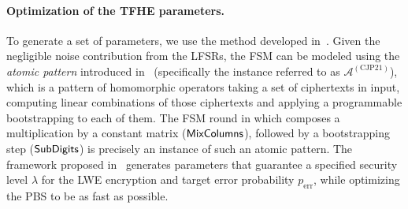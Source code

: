 \fi

\paragraph{Optimization of the TFHE parameters.}
To generate a set of parameters, we use the method developed in~\cite{JC:BBBCLOT23}. Given the negligible noise contribution from the LFSRs, the FSM can be modeled using the \emph{atomic pattern} introduced in~\cite{JC:BBBCLOT23} (specifically the instance referred to as $\mathcal{A}^{(\text{CJP21})}$), which is a pattern of homomorphic operators taking a set of ciphertexts in input, computing linear combinations of those ciphertexts and applying a programmable bootstrapping to each of them. The FSM round in \coolName which composes a multiplication by a constant matrix ($\text{\textsf{MixColumns}}$), followed by a bootstrapping step ($\text{\textsf{SubDigits}}$) is precisely an instance of such an atomic pattern. The framework proposed in~\cite{JC:BBBCLOT23} generates parameters that guarantee a specified security level $\lambda$ for the LWE encryption and target error probability $p_{\text{err}}$, while optimizing the PBS to be as fast as possible. 
\fi


